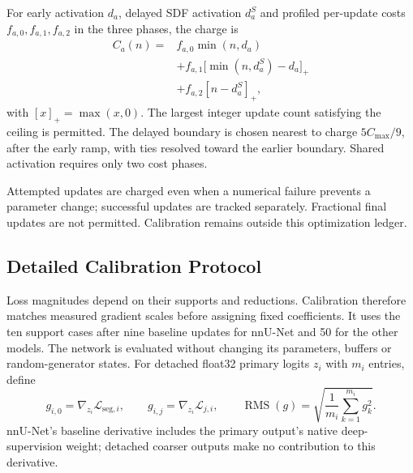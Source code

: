 \documentclass[12pt,a4paper]{article}
\begin{document}
For early activation $d_a$, delayed SDF activation $d_a^S$ and
profiled per-update costs $f_{a,0},f_{a,1},f_{a,2}$ in the three
phases, the charge is
\begin{equation}
\begin{aligned}
C_a(n)={}&f_{a,0}\min(n,d_a)\\
 &+f_{a,1}\bigl[\min(n,d_a^S)-d_a\bigr]_+\\
 &+f_{a,2}[n-d_a^S]_+,
\end{aligned}
\label{eq:piecewise-optimization-cost}
\end{equation}
with $[x]_+=\max(x,0)$. The largest integer update count satisfying
the ceiling is permitted. The delayed boundary is chosen nearest
to charge $5C_{\max}/9$, after the early ramp, with ties resolved
toward the earlier boundary. Shared activation requires only two
cost phases.

Attempted updates are charged even when a numerical failure prevents
a parameter change; successful updates are tracked separately.
Fractional final updates are not permitted. Calibration remains
outside this optimization ledger.

\clearpage

\subsection{Detailed Calibration Protocol}\label{sec:detailed-calibration}

Loss magnitudes depend on their supports and reductions. Calibration
therefore matches measured gradient scales before assigning fixed
coefficients. It uses the ten support cases after nine
baseline updates for nnU-Net and 50 for the other models. The network
is evaluated without changing its parameters, buffers or random-generator
states. For detached float32 primary logits $z_i$ with $m_i$ entries,
define
\begin{equation}
g_{i,0}=\nabla_{z_i}\mathcal{L}_{\mathrm{seg},i},
\qquad
g_{i,j}=\nabla_{z_i}\mathcal{L}_{j,i},
\qquad
\operatorname{RMS}(g)=
\sqrt{\frac{1}{m_i}\sum_{k=1}^{m_i}g_k^2}.
\label{eq:calibration-logit-gradients}
\end{equation}
nnU-Net's baseline derivative includes the primary output's native
deep-supervision weight; detached coarser outputs make no contribution
to this derivative.
\end{document}
